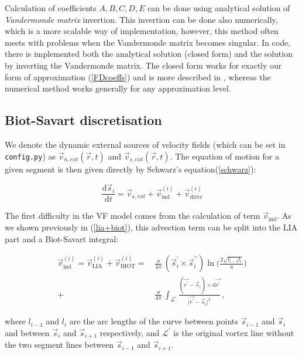 Calculation of coefficients $A, B, C, D, E$ can be done using analytical solution of \textit{Vandermonde matrix} invertion. This invertion can be done also numerically, which is a more scalable way of implementation, however, this method often meets with problems when the Vandermonde matrix becomes singular.
In code, there is implemented both the analytical solution (closed form) and the solution by inverting the Vandermonde matrix. The closed form works for exactly our form of approximation (\ref{FDcoeffs}) and is more described in \cite{FDclosed}, whereas the numerical method works generally for any approximation level.

\subsection*{Biot-Savart discretisation}

We denote the dynamic external sources of velocity fields (which can be set in \texttt{config.py}) as $\vec{v}_{n,ext}(\vec{r}, t)$ and $\vec{v}_{s,ext} (\vec{r}, t)$. The equation of motion for a given segment is then given directly by Schwarz's equation(\ref{schwarz}):

\begin{equation}
\frac{\text{d}\vec{s}_i}{\text{d}t} =
\vec{v}_{s,ext} + \vec{v}_{\text{ind}}^{(i)} + \vec{v}_{\text{drive}}^{(i)}
\end{equation}

The first difficulty in the VF model comes from the calculation of term $\vec{v}_{\text{ind}}$. As we shown previously in (\ref{lia+biot}), this advection term can be split into the LIA part and a Biot-Savart integral:

\begin{align}
\vec{v}_{\text{ind}}^{(i)} =
\vec{v}_{\text{LIA}}^{(i)} + \vec{v}_{\text{BIOT}}^{(i)} =&
\frac{\varkappa}{4\pi} (\vec{s}^{\prime}_i \times \vec{s}^{\prime \prime}_i)
\ln{\Bigg(\frac{2\sqrt{l_{i-1} l_i}}{a}\Bigg)}
\label{LIA}
\\
+& \frac{\varkappa}{4\pi} \int_{\mathcal{L}^{\prime}} \frac{(\vec{r^{\prime}} - \vec{s}_i) \times \text{d}\vec{r^{\prime}}}{\vert \vec{r^{\prime}} - \vec{s}_i \vert^3}\,,
\label{BIOT}
\end{align}

where $l_{i-1}$ and $l_i$ are the arc lengths of the curve between
points $\vec{s}_{i-1}$ and $\vec{s}_i$ and between $\vec{s}_i$ and $\vec{s}_{i+1}$ respectively, and $\mathcal{L}^{\prime}$ is the original vortex line without the two segment lines between $\vec{s}_{i-1}$ and $\vec{s}_{i+1}$.

